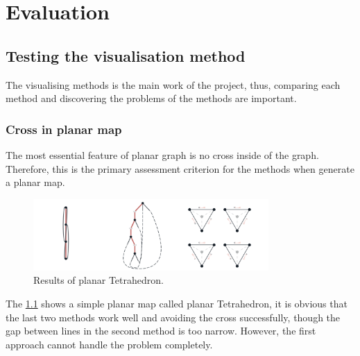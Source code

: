 
\chapter{Evaluation}

\section{Testing the visualisation method}

The visualising methods is the main work of the project, thus, comparing each method and discovering the problems of the methods are important.

\subsection{Cross in planar map}
The most essential feature of planar graph is no cross inside of the graph. Therefore, this is the primary assessment criterion for the methods when generate a planar map.

\begin{figure}[htb]
    \centering
    \includegraphics[width=0.8\textwidth]{../../image/cross1.png}
    \caption{Results of planar Tetrahedron.}
    \label{fig:figures:cross1}
  \end{figure}

  The \cref{fig:figures:cross1} shows a simple planar map called planar Tetrahedron, it is obvious that the last two methods work well and avoiding the cross successfully, though the gap between lines in the second method is too narrow. However, the first approach cannot handle the problem completely.

